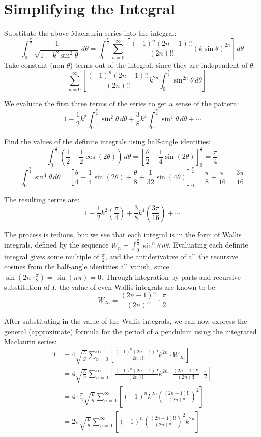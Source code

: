 \documentclass[12pt]{article}
\begin{document}
\section{Simplifying the Integral}

Substitute the above Maclaurin series into the integral:
\[
  \int_{0}^{\frac{\pi}{2}} \frac{1}{\sqrt{1 - k^2
  \sin^2 \theta}} \, d\theta = \int_{0}^{\frac{\pi}{2}}
  \sum_{n=0}^{\infty} \left[\frac{(-1)^n (2n-1)!!}{(2n)!!}
  {\left(k\sin\theta\right)}^{2n}\right] \, d\theta
\]
Take constant (non-$\theta$) terms out of the integral, since they
are independent of $\theta$:
\[
  = \sum_{n=0}^{\infty} \left[\frac{(-1)^n (2n-1)!!}{(2n)!!} k^{2n}
  \int_{0}^{\frac{\pi}{2}} \sin^{2n} \theta \, d\theta\right]
\]

We evaluate the first three terms of the series to get a sense of the pattern:
\[
  1 - \frac{1}{2}k^2\int_{0}^{\frac{\pi}{2}} \sin^2 \theta \, d\theta
  + \frac{3}{8}k^4\int_{0}^{\frac{\pi}{2}} \sin^4 \theta \, d\theta + \cdots
\]

Find the values of the definite integrals using half-angle identities:
\[
  \int_{0}^{\frac{\pi}{2}} \left(\frac{1}{2} -
  \frac{1}{2}\cos(2\theta)\right) \, d\theta = \left[\frac{\theta}{2}
  - \frac{1}{4}\sin(2\theta)\right]_{0}^{\frac{\pi}{2}} = \frac{\pi}{4}
\]
\[
  \int_{0}^{\frac{\pi}{2}} \sin^4 \theta \, d\theta =
  \left[\frac{\theta}{4} - \frac{1}{4}\sin(2\theta) +
    \frac{\theta}{8} +
  \frac{1}{32}\sin(4\theta)\right]_{0}^{\frac{\pi}{2}} =
  \frac{\pi}{8} + \frac{\pi}{16} = \frac{3\pi}{16}
\]

The resulting terms are:
\[
  1 - \frac{1}{2}k^2\left(\frac{\pi}{4}\right) +
  \frac{3}{8}k^4\left(\frac{3\pi}{16}\right) + \cdots
\]

The process is tedious, but we see that each integral is in the form
of Wallis integrals, defined by the sequence $W_n =
\int_{0}^{\frac{\pi}{2}} \sin^n \theta \, d\theta$. Evaluating each
definite integral gives some multiple of $\frac{\pi}{2}$, and the
antiderivative of all the recursive cosines from the half-angle
identities all vanish, since $\sin(2n \cdot \frac{\pi}{2}) =
\sin(n\pi) = 0$. Through integration by parts and recursive
substitution of $I$, the value of even Wallis integrals are known to be:
\[
  W_{2n} = \frac{(2n-1)!!}{(2n)!!} \cdot \frac{\pi}{2}
\]

After substituting in the value of the Wallis integrals, we can now express the general (approximate) formula for the period of a pendulum using the integrated Maclaurin series:
\begin{align*}
  T &= 4 \sqrt{\frac{L}{g}} \sum_{n=0}^{\infty} \left[\frac{(-1)^n (2n-1)!!}{(2n)!!} k^{2n} \cdot W_{2n}\right] \\
  &= 4 \sqrt{\frac{L}{g}} \sum_{n=0}^{\infty} \left[\frac{(-1)^n (2n-1)!!}{(2n)!!} k^{2n} \cdot \frac{(2n-1)!!}{(2n)!!} \cdot \frac{\pi}{2}\right] \\
  &= 4 \cdot \frac{\pi}{2} \sqrt{\frac{L}{g}} \sum_{n=0}^{\infty} \left[(-1)^n k^{2n} \left(\frac{(2n-1)!!}{(2n)!!}\right)^2 \right] \\
  &= 2\pi \sqrt{\frac{L}{g}} \sum_{n=0}^{\infty} \left[(-1)^n \left(\frac{(2n-1)!!}{(2n)!!}\right)^2 k^{2n} \right]
\end{align*}
\end{document}
